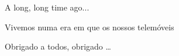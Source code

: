


A long, long time ago... 


Vivemos numa era em que os nossos telemóveis 



Obrigado a todos, obrigado \ldots
